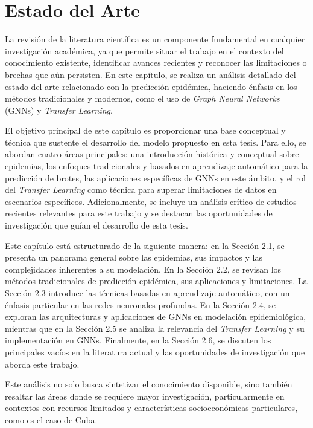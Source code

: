\chapter{Estado del Arte}\label{chapter:state-of-the-art}

La revisión de la literatura científica es un componente fundamental en cualquier investigación académica, ya que permite situar el trabajo en el contexto del conocimiento existente, identificar avances recientes y reconocer las limitaciones o brechas que aún persisten. En este capítulo, se realiza un análisis detallado del estado del arte relacionado con la predicción epidémica, haciendo énfasis en los métodos tradicionales y modernos, como el uso de \textit{Graph Neural Networks} (GNNs) y \textit{Transfer Learning}. 

El objetivo principal de este capítulo es proporcionar una base conceptual y técnica que sustente el desarrollo del modelo propuesto en esta tesis. Para ello, se abordan cuatro áreas principales: una introducción histórica y conceptual sobre epidemias, los enfoques tradicionales y basados en aprendizaje automático para la predicción de brotes, las aplicaciones específicas de GNNs en este ámbito, y el rol del \textit{Transfer Learning} como técnica para superar limitaciones de datos en escenarios específicos. Adicionalmente, se incluye un análisis crítico de estudios recientes relevantes para este trabajo y se destacan las oportunidades de investigación que guían el desarrollo de esta tesis.

Este capítulo está estructurado de la siguiente manera: en la Sección 2.1, se presenta un panorama general sobre las epidemias, sus impactos y las complejidades inherentes a su modelación. En la Sección 2.2, se revisan los métodos tradicionales de predicción epidémica, sus aplicaciones y limitaciones. La Sección 2.3 introduce las técnicas basadas en aprendizaje automático, con un énfasis particular en las redes neuronales profundas. En la Sección 2.4, se exploran las arquitecturas y aplicaciones de GNNs en modelación epidemiológica, mientras que en la Sección 2.5 se analiza la relevancia del \textit{Transfer Learning} y su implementación en GNNs. Finalmente, en la Sección 2.6, se discuten los principales vacíos en la literatura actual y las oportunidades de investigación que aborda este trabajo.

Este análisis no solo busca sintetizar el conocimiento disponible, sino también resaltar las áreas donde se requiere mayor investigación, particularmente en contextos con recursos limitados y características socioeconómicas particulares, como es el caso de Cuba.

